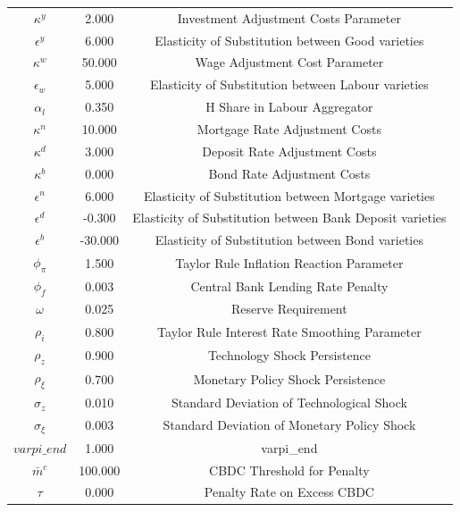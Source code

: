 \begin{center}
\begin{longtable}{ccc}
$\kappa^y$ 	 & 	 2.000 	 & 	 Investment Adjustment Costs Parameter\\
$\epsilon^y$ 	 & 	 6.000 	 & 	 Elasticity of Substitution between Good varieties\\
$\kappa^w$ 	 & 	 50.000 	 & 	 Wage Adjustment Cost Parameter\\
$\epsilon_w$ 	 & 	 5.000 	 & 	 Elasticity of Substitution between Labour varieties\\
$\alpha_l$ 	 & 	 0.350 	 & 	 H Share in Labour Aggregator\\
$\kappa^n$ 	 & 	 10.000 	 & 	 Mortgage Rate Adjustment Costs\\
$\kappa^d$ 	 & 	 3.000 	 & 	 Deposit Rate Adjustment Costs\\
$\kappa^b$ 	 & 	 0.000 	 & 	 Bond Rate Adjustment Costs\\
$\epsilon^n$ 	 & 	 6.000 	 & 	 Elasticity of Substitution between Mortgage varieties\\
$\epsilon^d$ 	 & 	 -0.300 	 & 	 Elasticity of Substitution between Bank Deposit varieties\\
$\epsilon^b$ 	 & 	 -30.000 	 & 	 Elasticity of Substitution between Bond varieties\\
$\phi_\pi$ 	 & 	 1.500 	 & 	 Taylor Rule Inflation Reaction Parameter\\
$\phi_f$ 	 & 	 0.003 	 & 	 Central Bank Lending Rate Penalty\\
$\omega$ 	 & 	 0.025 	 & 	 Reserve Requirement\\
$\rho_i$ 	 & 	 0.800 	 & 	 Taylor Rule Interest Rate Smoothing Parameter\\
$\rho_z$ 	 & 	 0.900 	 & 	 Technology Shock Persistence\\
$\rho_\xi$ 	 & 	 0.700 	 & 	 Monetary Policy Shock Persistence\\
$\sigma_z$ 	 & 	 0.010 	 & 	 Standard Deviation of Technological Shock\\
$\sigma_\xi$ 	 & 	 0.003 	 & 	 Standard Deviation of Monetary Policy Shock\\
$varpi\_end$ 	 & 	 1.000 	 & 	 varpi\_end\\
$\bar{m}^c$ 	 & 	 100.000 	 & 	 CBDC Threshold for Penalty\\
$\tau$ 	 & 	 0.000 	 & 	 Penalty Rate on Excess CBDC\\
\bottomrule%
\end{longtable}
\end{center}
